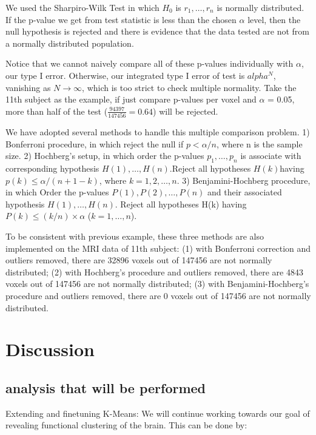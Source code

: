 \documentclass[11pt]{article}
\begin{document}
We used the Sharpiro-Wilk Test in which $H_0$ is $r_1,\dots ,r_n$ is normally
distributed. If the p-value we get from test statistic is less than the chosen
$\alpha$ level, then the null hypothesis is rejected and there is evidence that
the data tested are not from a normally distributed population.

Notice that we cannot naively compare all of these p-values individually with
$\alpha$, our type I error. Otherwise, our integrated type I error of test is
$alpha^N$, vanishing as $N \rightarrow \infty$, which is too strict to check
multiple normality. Take the 11th subject as the example, if just compare
p-values per voxel and $\alpha$ = 0.05, more than half of the test
($\frac{94397}{147456} =0.64$) will be rejected.

We have adopted several methods to handle this multiple comparison problem. 1)
Bonferroni procedure, in which reject the null if $p< \alpha/n$, where n is the
sample size. 2) Hochberg’s setup, in which order the p-values $p_1,\dots,p_n$ is
associate with corresponding hypothesis $H(1), \dots, H(n)$.Reject all
hypotheses $H(k) $having $p(k)\leq \alpha/(n+1-k)$, where $ k=1,2,\dots,n$. 3)
Benjamini-Hochberg procedure, in which Order the p-values $P(1),P(2),\dots,P(n)$
and their associated hypothesis $H(1),\dots,H(n)$. Reject all hypotheses H(k)
having $P(k) \leq (k/n)\times \alpha $ ($k=1,\dots ,n$).

To be consistent with previous example, these three methods are also implemented
on the MRI data of 11th subject: (1) with Bonferroni correction and outliers
removed, there are 32896 voxels out of 147456 are not normally distributed; (2)
with Hochberg's procedure and outliers removed, there are 4843 voxels out of
147456 are not normally distributed; (3) with Benjamini-Hochberg's procedure and
outliers removed, there are 0 voxels out of 147456 are not normally distributed.


\section{Discussion}

\subsection{analysis that will be performed}

Extending and finetuning K-Means: We will continue working towards our goal of
revealing functional clustering of the brain. This can be done by:
 
\end{document}
